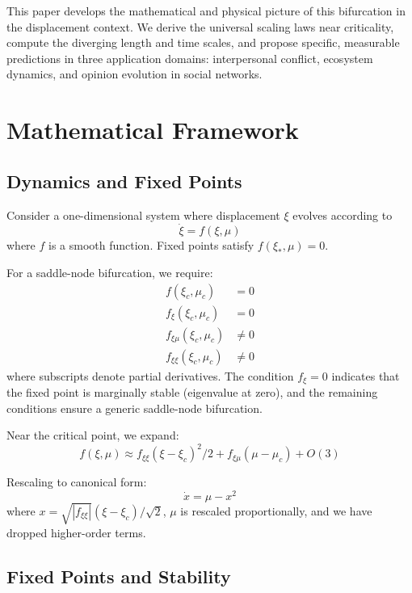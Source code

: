 \documentclass[12pt]{article}
\begin{document}
This paper develops the mathematical and physical picture of this bifurcation in the displacement context. We derive the universal scaling laws near criticality, compute the diverging length and time scales, and propose specific, measurable predictions in three application domains: interpersonal conflict, ecosystem dynamics, and opinion evolution in social networks.

\section{Mathematical Framework}

\subsection{Dynamics and Fixed Points}

Consider a one-dimensional system where displacement $\xi$ evolves according to
\begin{equation}
\dot{\xi} = f(\xi, \mu)
\end{equation}
where $f$ is a smooth function. Fixed points satisfy $f(\xi_*, \mu) = 0$.

For a saddle-node bifurcation, we require:
\begin{align}
f(\xi_c, \mu_c) &= 0 \\
f_\xi(\xi_c, \mu_c) &= 0 \\
f_{\xi\mu}(\xi_c, \mu_c) &\neq 0 \\
f_{\xi\xi}(\xi_c, \mu_c) &\neq 0
\end{align}
where subscripts denote partial derivatives. The condition $f_\xi = 0$ indicates that the fixed point is marginally stable (eigenvalue at zero), and the remaining conditions ensure a generic saddle-node bifurcation.

Near the critical point, we expand:
\begin{equation}
f(\xi, \mu) \approx f_{\xi\xi}(\xi - \xi_c)^2 / 2 + f_{\xi\mu}(\mu - \mu_c) + O(3)
\end{equation}

Rescaling to canonical form:
\begin{equation}
\dot{x} = \mu - x^2
\end{equation}
where $x = \sqrt{|f_{\xi\xi}|} (\xi - \xi_c) / \sqrt{2}$, $\mu$ is rescaled proportionally, and we have dropped higher-order terms.

\subsection{Fixed Points and Stability}
\end{document}
